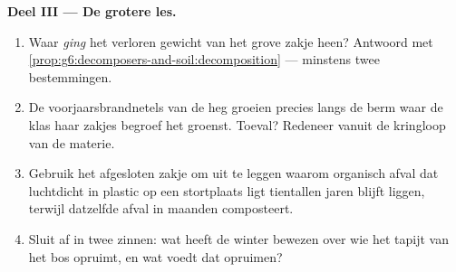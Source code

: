 \begin{problem}
\medskip\noindent\textbf{Deel III --- De grotere les.}
\begin{enumerate}[resume]
  \item Waar \emph{ging} het verloren gewicht van het grove zakje heen?
        Antwoord met
        \cref{prop:g6:decomposers-and-soil:decomposition} --- minstens
        twee bestemmingen.
  \item De voorjaarsbrandnetels van de heg groeien precies langs de berm
        waar de klas haar zakjes begroef het groenst. Toeval? Redeneer
        vanuit de kringloop van de materie.
  \item Gebruik het afgesloten zakje om uit te leggen waarom organisch
        afval dat luchtdicht in plastic op een stortplaats ligt
        tientallen jaren blijft liggen, terwijl datzelfde afval in
        maanden composteert.
  \item Sluit af in twee zinnen: wat heeft de winter bewezen over wie het
        tapijt van het bos opruimt, en wat voedt dat opruimen?
\end{enumerate}
\end{problem}
